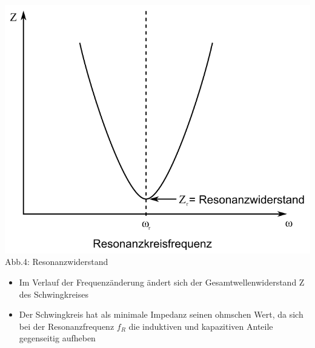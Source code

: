 \begin{frame}
\begin{center}
\begin{minipage}{0.4\textwidth}
	\includegraphics[height=.5\textheight,width=\textwidth,keepaspectratio]{a04/SerirenschwSig.png}\\
	\tiny{Abb.4: Resonanzwiderstand \cite{wmen}} 
	\end{minipage}
\end{center}
\begin{itemize}
	\item Im Verlauf der Frequenzänderung ändert sich der Gesamtwellenwiderstand Z des Schwingkreises
	\item Der Schwingkreis hat als minimale Impedanz seinen ohmschen Wert, da sich bei der Resonanzfrequenz $f_R$ die induktiven und kapazitiven Anteile gegenseitig aufheben
\end{itemize}
\end{frame}

